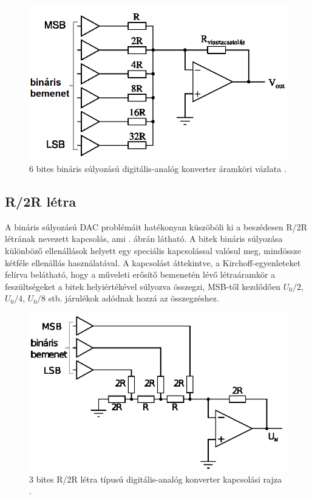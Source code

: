 \documentclass[12pt]{article}
\theoremstyle{plain}
\begin{document}
\begin{figure}
	\centering
	\includegraphics[width=0.7\linewidth]{media/DAC_binaris}
	\caption{6 bites bináris súlyozású digitális-analóg konverter áramköri vázlata \cite{Bagoly}.}
	\label{fig:dacbinaris}
\end{figure}


\subsection{R/2R létra}

A bináris súlyozású DAC problémáit hatékonyan küszöböli ki a beszédesen R/2R létrának nevezett kapcsolás, ami . ábrán látható.
A bitek bináris súlyozása különböző ellenállások helyett egy speciális kapcsolással valósul meg, mindössze kétféle ellenállás használatával. A kapcsolást áttekintve, a Kirchoff-egyenleteket felírva belátható, hogy a műveleti erősítő bemenetén lévő létraáramkör a feszültségeket a bitek helyiértékével súlyozva összegzi, MSB-től kezdődően $U_0/2$, $U_0/4$, $U_0/8$ stb. járulékok adódnak hozzá az összegzéshez.


\begin{figure}
	\centering
	\includegraphics[width=0.7\linewidth]{media/DAC_letra}
	\caption{3 bites R/2R létra típusú digitális-analóg konverter kapcsolási rajza \cite{Bagoly}.}
	\label{fig:dacletra}
\end{figure}
\end{document}
